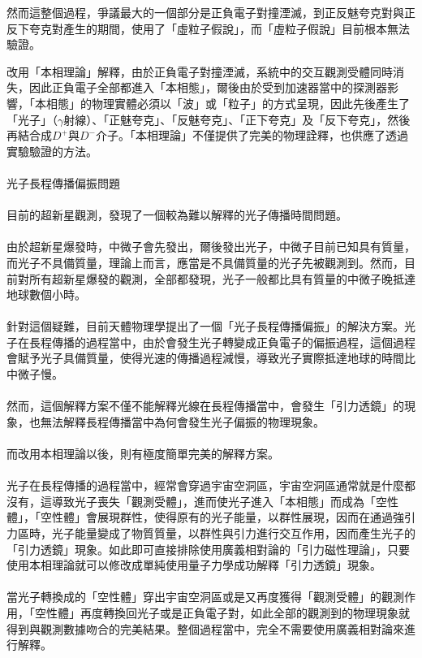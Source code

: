 \documentclass[a4paper,notitlepage,UTF8]{ctexart}
\begin{document}
然而這整個過程，爭議最大的一個部分是正負電子對撞湮滅，到正反魅夸克對與正反下夸克對產生的期間，使用了「虛粒子假說」，而「虛粒子假說」目前根本無法驗證。

改用「本相理論」解釋，由於正負電子對撞湮滅，系統中的交互觀測受體同時消失，因此正負電子全部都進入「本相態」，爾後由於受到加速器當中的探測器影響，「本相態」的物理實體必須以「波」或「粒子」的方式呈現，因此先後產生了「光子」（$\gamma$射線）、「正魅夸克」、「反魅夸克」、「正下夸克」及「反下夸克」，然後再結合成$D^+$與$D^-$介子。「本相理論」不僅提供了完美的物理詮釋，也供應了透過實驗驗證的方法。
\\
\\
光子長程傳播偏振問題
\\
\\
目前的超新星觀測，發現了一個較為難以解釋的光子傳播時間問題。
\\
\\
由於超新星爆發時，中微子會先發出，爾後發出光子，中微子目前已知具有質量，而光子不具備質量，理論上而言，應當是不具備質量的光子先被觀測到。然而，目前對所有超新星爆發的觀測，全部都發現，光子一般都比具有質量的中微子晚抵達地球數個小時。
\\
\\
針對這個疑難，目前天體物理學提出了一個「光子長程傳播偏振」的解決方案。光子在長程傳播的過程當中，由於會發生光子轉變成正負電子的偏振過程，這個過程會賦予光子具備質量，使得光速的傳播過程減慢，導致光子實際抵達地球的時間比中微子慢。
\\
\\
然而，這個解釋方案不僅不能解釋光線在長程傳播當中，會發生「引力透鏡」的現象，也無法解釋長程傳播當中為何會發生光子偏振的物理現象。
\\
\\
而改用本相理論以後，則有極度簡單完美的解釋方案。
\\
\\
光子在長程傳播的過程當中，經常會穿過宇宙空洞區，宇宙空洞區通常就是什麼都沒有，這導致光子喪失「觀測受體」，進而使光子進入「本相態」而成為「空性體」，「空性體」會展現群性，使得原有的光子能量，以群性展現，因而在通過強引力區時，光子能量變成了物質質量，以群性與引力進行交互作用，因而產生光子的「引力透鏡」現象。如此即可直接排除使用廣義相對論的「引力磁性理論」，只要使用本相理論就可以修改成單純使用量子力學成功解釋「引力透鏡」現象。
\\
\\
當光子轉換成的「空性體」穿出宇宙空洞區或是又再度獲得「觀測受體」的觀測作用，「空性體」再度轉換回光子或是正負電子對，如此全部的觀測到的物理現象就得到與觀測數據吻合的完美結果。整個過程當中，完全不需要使用廣義相對論來進行解釋。
\end{document}
